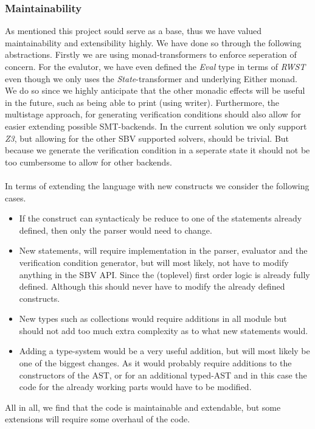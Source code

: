 \subsubsection{Maintainability}
As mentioned this project sould serve as a base, thus we have valued maintainability and extensibility highly. We have done so through the following abstractions. Firstly we are using monad-transformers to enforce seperation of concern. For the evalutor, we have even defined the \textit{Eval} type in terms of \textit{RWST} even though we only uses the \textit{State}-transformer and underlying Either monad. We do so since we highly anticipate that the other monadic effects will be useful in the future, such as being able to print (using writer).
Furthermore, the multistage approach, for generating verification conditions should also allow for easier extending possible SMT-backends.
In the current solution we only support \textit{Z3}, but allowing for the other SBV supported solvers, should be trivial.
But because we generate the verification condition in a seperate state it should not be too cumbersome to allow for other backends.
\\~\\
In terms of extending the language with new constructs we consider the following cases.
\begin{itemize}
  \item If the construct can syntacticaly be reduce to one of the statements already defined, then only the parser would need to change.
  \item New statements, will require implementation in the parser, evaluator and the verification condition generator, but will most likely, not have to modify anything in the SBV API.
  Since the (toplevel) first order logic is already fully defined.
  Although this should never have to modify the already defined constructs.
  \item New types such as collections would require additions in all module but should not add too much extra complexity as to what new statements would.
  \item Adding a type-system would be a very useful addition, but will most likely be one of the biggest changes. As it would probably require additions to the constructors of the AST, or for an additional typed-AST and in this case the code for the already working parts would have to be modified.
\end{itemize}
All in all, we find that the code is maintainable and extendable, but some extensions will require some overhaul of the code.







